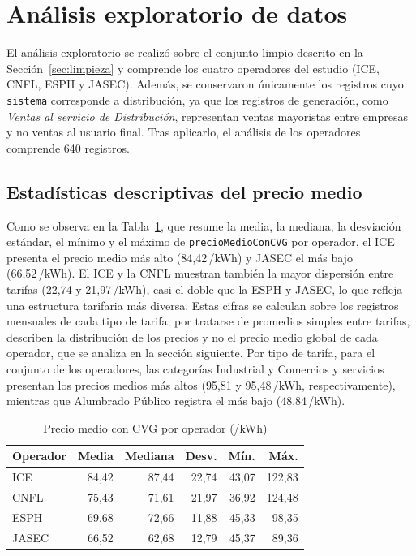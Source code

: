 \documentclass[conference]{IEEEtran}
\newcommand{\crc}{\textcolonmonetary} %
\begin{document}
\section{An\'alisis exploratorio de datos}
\label{sec:eda}

El an\'alisis exploratorio se realiz\'o sobre el conjunto limpio descrito en la Secci\'on~\ref{sec:limpieza} y comprende los cuatro operadores del estudio (ICE, CNFL, ESPH y JASEC). Adem\'as, se conservaron \'unicamente los registros cuyo \texttt{sistema} corresponde a distribuci\'on, ya que los registros de generaci\'on, como \emph{Ventas al servicio de Distribuci\'on}, representan ventas mayoristas entre empresas y no ventas al usuario final. Tras aplicarlo, el an\'alisis de los operadores comprende 640 registros.


\subsection{Estad\'isticas descriptivas del precio medio}

Como se observa en la Tabla~\ref{tab:desc-operador}, que resume la media, la mediana, la desviaci\'on est\'andar, el m\'inimo y el m\'aximo de \texttt{precioMedioConCVG} por operador, el ICE presenta el precio medio m\'as alto (84,42\,\crc/kWh) y JASEC el m\'as bajo (66,52\,\crc/kWh). El ICE y la CNFL muestran tambi\'en la mayor dispersi\'on entre tarifas (22,74 y 21,97\,\crc/kWh), casi el doble que la ESPH y JASEC, lo que refleja una estructura tarifaria m\'as diversa. Estas cifras se calculan sobre los registros mensuales de cada tipo de tarifa; por tratarse de promedios simples entre tarifas, describen la distribuci\'on de los precios y no el precio medio global de cada operador, que se analiza en la secci\'on siguiente. Por tipo de tarifa, para el conjunto de los operadores, las categor\'ias Industrial y Comercios y servicios presentan los precios medios m\'as altos (95,81 y 95,48\,\crc/kWh, respectivamente), mientras que Alumbrado P\'ublico registra el m\'as bajo (48,84\,\crc/kWh).

\begin{table}[htbp]
\caption{Precio medio con CVG por operador (\crc/kWh)}
\label{tab:desc-operador}
\centering
\scriptsize
\renewcommand{\arraystretch}{1.15}
\begin{tabular*}{\columnwidth}{@{\extracolsep{\fill}}lrrrrr@{}}
\hline
\textbf{Operador} & \textbf{Media} & \textbf{Mediana} & \textbf{Desv.} & \textbf{M\'in.} & \textbf{M\'ax.} \\
\hline
ICE   & 84,42 & 87,44 & 22,74 & 43,07 & 122,83 \\
CNFL  & 75,43 & 71,61 & 21,97 & 36,92 & 124,48 \\
ESPH  & 69,68 & 72,66 & 11,88 & 45,33 & 98,35 \\
JASEC & 66,52 & 62,68 & 12,79 & 45,37 & 89,36 \\
\hline
\end{tabular*}
\end{table}
\FloatBarrier
\end{document}
